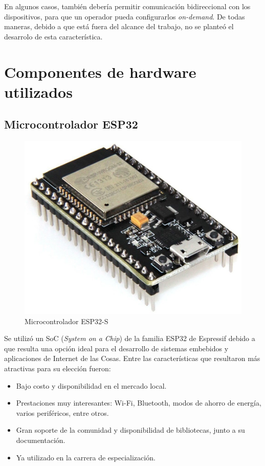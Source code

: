 En algunos casos, también debería permitir comunicación bidireccional con los dispositivos, para que un operador pueda configurarlos \textit{on-demand}. De todas maneras, debido a que está fuera del alcance del trabajo, no se planteó el desarrolo de esta característica.

\section{Componentes de hardware utilizados}

\subsection{Microcontrolador ESP32}

\begin{figure}[H]
	\centering
	\includegraphics[width=.6\textwidth]{./Figures/esp32s.png}
	\caption{Microcontrolador ESP32-S}
	\label{fig:texmaker}
\end{figure}

Se utilizó un SoC (\textit{System on a Chip}) de la familia ESP32 de Espressif debido a que resulta una opción ideal para el desarrollo de sistemas embebidos y aplicaciones de Internet de las Cosas. Entre las características que resultaron más atractivas para su elección fueron\citep{ESP32:1}:
\begin{itemize}
	\item Bajo costo y disponibilidad en el mercado local.
	\item Prestaciones muy interesantes: Wi-Fi, Bluetooth, modos de ahorro de energía, varios periféricos, entre otros.
	\item Gran soporte de la comunidad y disponibilidad de bibliotecas, junto a su documentación.
	\item Ya utilizado en la carrera de especialización.
\end{itemize}

